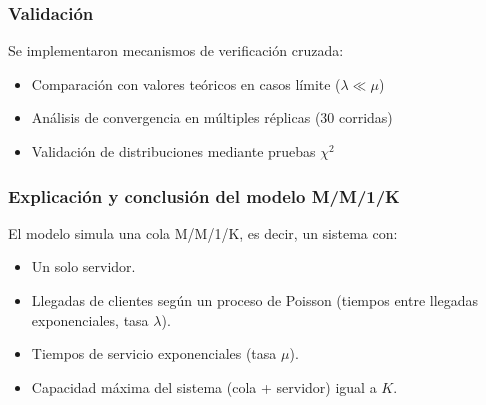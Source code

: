 \documentclass{article}
\begin{document}
\subsubsection{Validación}
Se implementaron mecanismos de verificación cruzada:
\begin{itemize}
    \item Comparación con valores teóricos en casos límite ($\lambda \ll \mu$)
    \item Análisis de convergencia en múltiples réplicas (30 corridas)
    \item Validación de distribuciones mediante pruebas $\chi^2$
\end{itemize}


\subsubsection{Explicación y conclusión del modelo M/M/1/K}


El modelo simula una cola M/M/1/K, es decir, un sistema con:
\begin{itemize}
    \item Un solo servidor.
    \item Llegadas de clientes según un proceso de Poisson (tiempos entre llegadas exponenciales, tasa $\lambda$).
    \item Tiempos de servicio exponenciales (tasa $\mu$).
    \item Capacidad máxima del sistema (cola + servidor) igual a $K$.
\end{itemize}
\end{document}
